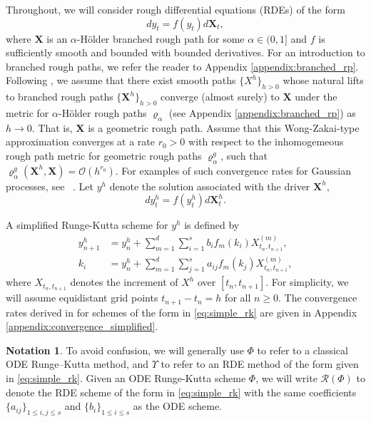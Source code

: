 \documentclass{article} %
\theoremstyle{definition}
\newtheorem{notation}{Notation}[section]
\theoremstyle{remark}
\begin{document}
Throughout, we will consider rough differential equations (RDEs) of the form
\begin{equation}\label{eq:rde}
    dy_t = f(y_t) d \mathbf{X}_t,
\end{equation}
where $\mathbf{X}$ is an $\alpha$-H\"older branched rough path for some $\alpha \in (0,1]$ and $f$ is sufficiently smooth and bounded with bounded derivatives. For an introduction to branched rough paths, we refer the reader to Appendix \ref{appendix:branched_rp}. Following \citet{redmann2022runge}, we assume that there exist smooth paths $\{X^h\}_{h > 0}$ whose natural lifts to branched rough paths $\{\mathbf{X}^h\}_{h > 0}$ converge (almost surely) to $\mathbf{X}$ under the metric for $\alpha$-H\"older rough paths $\varrho_\alpha$ (see Appendix \ref{appendix:branched_rp}) as $h \to 0$. That is, $\mathbf{X}$ is a geometric rough path. Assume that this Wong-Zakai-type approximation converges at a rate $r_0 > 0$ with respect to the inhomogemeous rough path metric for geometric rough paths $\varrho_\alpha^g$, such that $\varrho_\alpha^g(\mathbf{X}^h, \mathbf{X}) = \mathcal{O}(h^{r_0})$. For examples of such convergence rates for Gaussian processes, see ~\cite{friz2014convergence}. Let $y^h$ denote the solution associated with the driver $\mathbf{X}^h$,
\begin{equation}\label{eq:approx_rde}
    dy^h_t = f(y^h_t) d\mathbf{X}^h_t.
\end{equation}

A simplified Runge-Kutta scheme for $y^h$ is defined by
\begin{align}\label{eq:simple_rk}
    y^h_{n+1} &= y^h_n + \sum_{m=1}^d\sum_{i=1}^s b_i f_m(k_i) X^{(m)}_{t_n, t_{n+1}},\\
    k_i &= y^h_n + \sum_{m=1}^d\sum_{j=1}^s a_{ij} f_m(k_j) X^{(m)}_{t_n, t_{n+1}},\nonumber
\end{align}
where $X_{t_n, t_{n+1}}$ denotes the increment of $X^h$ over $[t_n, t_{n+1}]$. For simplicity, we will assume equidistant grid points $t_{n+1} - t_n = h$ for all $n \geq 0$. The convergence rates derived in \citet{redmann2020runge} for schemes of the form in \eqref{eq:simple_rk} are given in Appendix \ref{appendix:convergence_simplified}.

\begin{notation}
    To avoid confusion, we will generally use $\Phi$ to refer to a classical ODE Runge--Kutta method, and $\Upsilon$ to refer to an RDE method of the form given in \eqref{eq:simple_rk}. Given an ODE Runge-Kutta scheme $\Phi$, we will write $\mathcal{R}(\Phi)$ to denote the RDE scheme of the form in \eqref{eq:simple_rk} with the same coefficients $\{a_{ij}\}_{1 \leq i,j\leq s}$ and $\{b_i\}_{1 \leq i \leq s}$ as the ODE scheme.\par\medskip
\end{notation}
\end{document}

